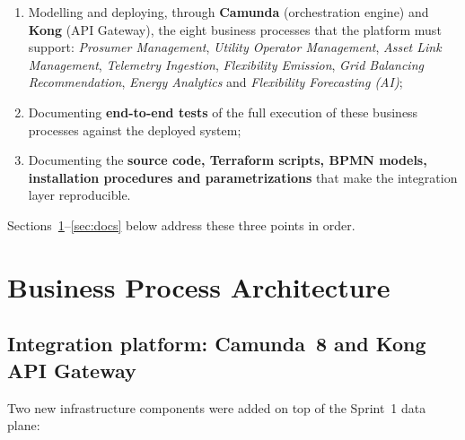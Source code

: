 \documentclass[11pt,a4paper]{article}
\begin{document}
\begin{enumerate}[label=(\arabic*)] \item Modelling and deploying, through \textbf{Camunda} (orchestration engine) and \textbf{Kong} (API Gateway), the eight business processes that the platform must support: \emph{Prosumer Management}, \emph{Utility Operator Management}, \emph{Asset Link Management}, \emph{Telemetry Ingestion}, \emph{Flexibility Emission}, \emph{Grid Balancing Recommendation}, \emph{Energy Analytics} and \emph{Flexibility Forecasting (AI)}; \item Documenting \textbf{end-to-end tests} of the full execution of these business processes against the deployed system; \item Documenting the \textbf{source code, Terraform scripts, BPMN models, installation procedures and parametrizations} that make the integration layer reproducible.
\end{enumerate}
 
Sections~\ref{sec:architecture}--\ref{sec:docs} below address these three
points in order.
 
\section{Business Process Architecture}
\label{sec:architecture}
 
\subsection{Integration platform: Camunda~8 and Kong API Gateway}
 
Two new infrastructure components were added on top of the Sprint~1 data plane:
 
\end{document}
